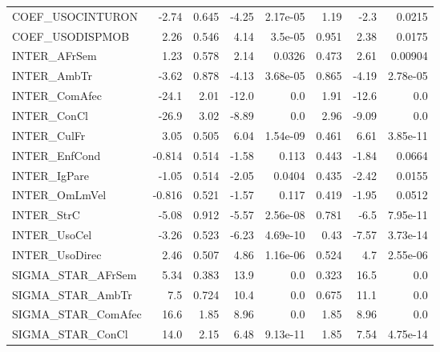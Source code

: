 \begin{tabular}{lrrrrrrr}
COEF\_USOCINTURON    &   -2.74 &    0.645 &   -4.25 & 2.17e-05 &          1.19 &         -2.3 &        0.0215 \\
COEF\_USODISPMOB     &    2.26 &    0.546 &    4.14 &  3.5e-05 &         0.951 &         2.38 &        0.0175 \\
INTER\_AFrSem        &    1.23 &    0.578 &    2.14 &   0.0326 &         0.473 &         2.61 &       0.00904 \\
INTER\_AmbTr         &   -3.62 &    0.878 &   -4.13 & 3.68e-05 &         0.865 &        -4.19 &      2.78e-05 \\
INTER\_ComAfec       &   -24.1 &     2.01 &   -12.0 &      0.0 &          1.91 &        -12.6 &           0.0 \\
INTER\_ConCl         &   -26.9 &     3.02 &   -8.89 &      0.0 &          2.96 &        -9.09 &           0.0 \\
INTER\_CulFr         &    3.05 &    0.505 &    6.04 & 1.54e-09 &         0.461 &         6.61 &      3.85e-11 \\
INTER\_EnfCond       &  -0.814 &    0.514 &   -1.58 &    0.113 &         0.443 &        -1.84 &        0.0664 \\
INTER\_IgPare        &   -1.05 &    0.514 &   -2.05 &   0.0404 &         0.435 &        -2.42 &        0.0155 \\
INTER\_OmLmVel       &  -0.816 &    0.521 &   -1.57 &    0.117 &         0.419 &        -1.95 &        0.0512 \\
INTER\_StrC          &   -5.08 &    0.912 &   -5.57 & 2.56e-08 &         0.781 &         -6.5 &      7.95e-11 \\
INTER\_UsoCel        &   -3.26 &    0.523 &   -6.23 & 4.69e-10 &          0.43 &        -7.57 &      3.73e-14 \\
INTER\_UsoDirec      &    2.46 &    0.507 &    4.86 & 1.16e-06 &         0.524 &          4.7 &      2.55e-06 \\
SIGMA\_STAR\_AFrSem   &    5.34 &    0.383 &    13.9 &      0.0 &         0.323 &         16.5 &           0.0 \\
SIGMA\_STAR\_AmbTr    &     7.5 &    0.724 &    10.4 &      0.0 &         0.675 &         11.1 &           0.0 \\
SIGMA\_STAR\_ComAfec  &    16.6 &     1.85 &    8.96 &      0.0 &          1.85 &         8.96 &           0.0 \\
SIGMA\_STAR\_ConCl    &    14.0 &     2.15 &    6.48 & 9.13e-11 &          1.85 &         7.54 &      4.75e-14 \\

\end{tabular}
